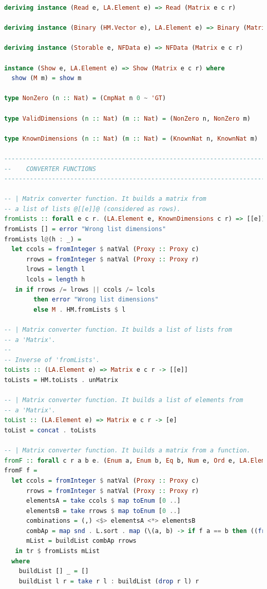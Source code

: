 \documentclass[
  oneside,
  11pt, a4paper,
  footinclude=true,
  headinclude=true,
  cleardoublepage=empty
]{scrbook}
\theoremstyle{definition}
\theoremstyle{definition}
\begin{document}
\begin{lstlisting}[language=Haskell, caption={Type safe matrix wrapper library},captionpos=b]
deriving instance (Read e, LA.Element e) => Read (Matrix e c r)

deriving instance (Binary (HM.Vector e), LA.Element e) => Binary (Matrix e c r)

deriving instance (Storable e, NFData e) => NFData (Matrix e c r)

instance (Show e, LA.Element e) => Show (Matrix e c r) where
  show (M m) = show m

type NonZero (n :: Nat) = (CmpNat n 0 ~ 'GT)

type ValidDimensions (n :: Nat) (m :: Nat) = (NonZero n, NonZero m)

type KnownDimensions (n :: Nat) (m :: Nat) = (KnownNat n, KnownNat m)

-------------------------------------------------------------------------------
--    CONVERTER FUNCTIONS
-------------------------------------------------------------------------------

-- | Matrix converter function. It builds a matrix from
-- a list of lists @[[e]]@ (considered as rows).
fromLists :: forall e c r. (LA.Element e, KnownDimensions c r) => [[e]] -> Matrix e c r
fromLists [] = error "Wrong list dimensions"
fromLists l@(h : _) =
  let ccols = fromInteger $ natVal (Proxy :: Proxy c)
      rrows = fromInteger $ natVal (Proxy :: Proxy r)
      lrows = length l
      lcols = length h
   in if rrows /= lrows || ccols /= lcols
        then error "Wrong list dimensions"
        else M . HM.fromLists $ l

-- | Matrix converter function. It builds a list of lists from
-- a 'Matrix'.
--
-- Inverse of 'fromLists'.
toLists :: (LA.Element e) => Matrix e c r -> [[e]]
toLists = HM.toLists . unMatrix

-- | Matrix converter function. It builds a list of elements from
-- a 'Matrix'.
toList :: (LA.Element e) => Matrix e c r -> [e]
toList = concat . toLists

-- | Matrix converter function. It builds a matrix from a function.
fromF :: forall c r a b e. (Enum a, Enum b, Eq b, Num e, Ord e, LA.Element e, KnownNat c, KnownNat r) => (a -> b) -> Matrix e c r
fromF f =
  let ccols = fromInteger $ natVal (Proxy :: Proxy c)
      rrows = fromInteger $ natVal (Proxy :: Proxy r)
      elementsA = take ccols $ map toEnum [0 ..]
      elementsB = take rrows $ map toEnum [0 ..]
      combinations = (,) <$> elementsA <*> elementsB
      combAp = map snd . L.sort . map (\(a, b) -> if f a == b then ((fromEnum a, fromEnum b), 1) else ((fromEnum a, fromEnum b), 0)) $ combinations
      mList = buildList combAp rrows
   in tr $ fromLists mList
  where
    buildList [] _ = []
    buildList l r = take r l : buildList (drop r l) r


\end{lstlisting}
\end{document}
